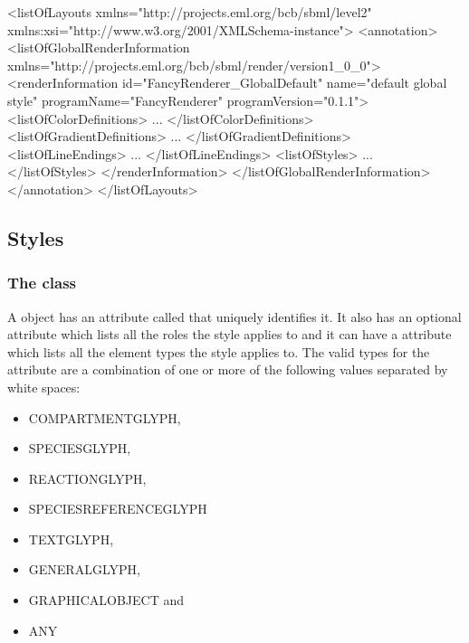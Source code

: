 {\footnotesize
\begin{example}
<listOfLayouts xmlns="http://projects.eml.org/bcb/sbml/level2"
         xmlns:xsi="http://www.w3.org/2001/XMLSchema-instance">
  <annotation>
    <listOfGlobalRenderInformation 
          xmlns="http://projects.eml.org/bcb/sbml/render/version1_0_0">
      <renderInformation id="FancyRenderer_GlobalDefault" 
                         name="default global style" 
                         programName="FancyRenderer" 
                         programVersion="0.1.1">
        <listOfColorDefinitions>
             ...
        </listOfColorDefinitions>
        <listOfGradientDefinitions>
             ...
        </listOfGradientDefinitions>
        <listOfLineEndings>
             ...
        </listOfLineEndings>
        <listOfStyles>
             ...
        </listOfStyles>
      </renderInformation>
    </listOfGlobalRenderInformation>
  </annotation>
</listOfLayouts>
\end{example}
}

\subsection{Styles}
\label{style-class}

\subsubsection{The \LocalStyle class}
\label{localstyle-class}
A \LocalStyle object has an attribute called  that uniquely identifies it. It also has an optional  attribute which lists all the roles 
the style applies to and it can have a  attribute which lists 
all the element types the style applies to. The valid types for the 
 attribute are a combination of one or more of the following 
values separated by white spaces:

\begin{itemize}
 \item COMPARTMENT\-GLYPH,
 \item SPECIES\-GLYPH,
 \item REACTION\-GLYPH, 
 \item SPECIES\-REFERENCE\-GLYPH
 \item TEXT\-GLYPH, 
 \item GENERAL\-GLYPH, 
 \item GRAPHICAL\-OBJECT and 
 \item ANY
\end{itemize}

